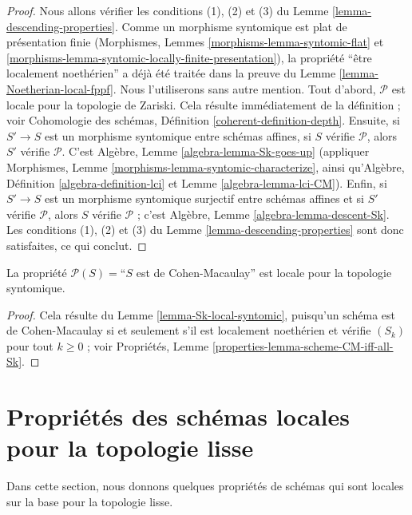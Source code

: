 \begin{proof}
Nous allons vérifier les conditions (1), (2) et (3) du Lemme
\ref{lemma-descending-properties}. Comme un morphisme syntomique est plat de
présentation finie (Morphismes, Lemmes
\ref{morphisms-lemma-syntomic-flat} et
\ref{morphisms-lemma-syntomic-locally-finite-presentation}), la propriété
``être localement noethérien'' a déjà été traitée dans la preuve du
Lemme \ref{lemma-Noetherian-local-fppf}. Nous l'utiliserons sans autre
mention. Tout d'abord, $\mathcal{P}$ est locale pour la topologie de Zariski.
Cela résulte immédiatement de la définition ; voir Cohomologie des schémas,
Définition \ref{coherent-definition-depth}. Ensuite, si $S' \to S$ est un
morphisme syntomique entre schémas affines, si $S$ vérifie $\mathcal{P}$,
alors $S'$ vérifie $\mathcal{P}$. C'est Algèbre, Lemme
\ref{algebra-lemma-Sk-goes-up} (appliquer Morphismes, Lemme
\ref{morphisms-lemma-syntomic-characterize}, ainsi qu'Algèbre, Définition
\ref{algebra-definition-lci} et Lemme \ref{algebra-lemma-lci-CM}).
Enfin, si $S' \to S$ est un morphisme syntomique surjectif entre schémas
affines et si $S'$ vérifie $\mathcal{P}$, alors $S$ vérifie $\mathcal{P}$ ;
c'est Algèbre, Lemme \ref{algebra-lemma-descent-Sk}.
Les conditions (1), (2) et (3) du Lemme
\ref{lemma-descending-properties} sont donc satisfaites, ce qui conclut.
\end{proof}

\begin{lemma}
\label{lemma-CM-local-syntomic}
La propriété $\mathcal{P}(S) =$``$S$ est de Cohen-Macaulay'' est locale pour
la topologie syntomique.
\end{lemma}

\begin{proof}
Cela résulte du Lemme \ref{lemma-Sk-local-syntomic}, puisqu'un schéma est de
Cohen-Macaulay si et seulement s'il est localement noethérien et vérifie
$(S_k)$ pour tout $k \geq 0$ ; voir Propriétés, Lemme
\ref{properties-lemma-scheme-CM-iff-all-Sk}.
\end{proof}







\section{Propriétés des schémas locales pour la topologie lisse}
\label{section-descending-properties-smooth}

\noindent
Dans cette section, nous donnons quelques propriétés de schémas qui sont
locales sur la base pour la topologie lisse.

